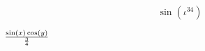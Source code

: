 \begin{equation}
  \sin(\iota^{34})
\end{equation}

$\frac{\sin \mleft(x\mright)\cos \mleft(y\mright)}{\frac{3}{4}}$